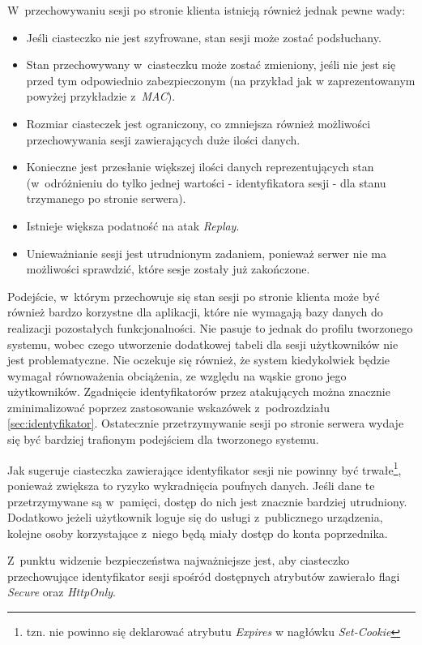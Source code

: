 \documentclass[11pt]{aghdpl}
\begin{document}
W~przechowywaniu sesji po stronie klienta istnieją również jednak pewne wady:
\begin{itemize}
\item Jeśli ciasteczko nie jest szyfrowane, stan sesji może zostać podsłuchany.
\item Stan przechowywany w~ciasteczku może zostać zmieniony, jeśli nie jest się przed tym odpowiednio zabezpieczonym (na przykład jak w zaprezentowanym powyżej przykładzie z~\emph{MAC}).
\item Rozmiar ciasteczek jest ograniczony, co zmniejsza również możliwości przechowywania sesji zawierających duże ilości danych.
\item Konieczne jest przesłanie większej ilości danych reprezentujących stan (w~odróżnieniu do tylko jednej wartości - identyfikatora sesji - dla stanu trzymanego po stronie serwera).
\item Istnieje większa podatność na atak \emph{Replay}.
\item Unieważnianie sesji jest utrudnionym zadaniem, ponieważ serwer nie ma możliwości sprawdzić, które sesje zostały już zakończone.
\end{itemize}

Podejście, w~którym przechowuje się stan sesji po stronie klienta może być również bardzo korzystne dla aplikacji, które nie wymagają bazy danych do realizacji pozostałych funkcjonalności. Nie pasuje to jednak do profilu tworzonego systemu, wobec czego utworzenie dodatkowej tabeli dla sesji użytkowników nie jest problematyczne. Nie oczekuje się również, że system kiedykolwiek będzie wymagał równoważenia obciążenia, ze względu na wąskie grono jego użytkowników. Zgadnięcie identyfikatorów przez atakujących można znacznie zminimalizować poprzez zastosowanie wskazówek z~podrozdziału \ref{sec:identyfikator}. Ostatecznie przetrzymywanie sesji po stronie serwera wydaje się być bardziej trafionym podejściem dla tworzonego systemu.

Jak sugeruje \cite{ClAu} ciasteczka zawierające identyfikator sesji nie powinny być trwałe\footnote{tzn. nie powinno się deklarować atrybutu \emph{Expires} w nagłówku \emph{Set-Cookie}}, ponieważ zwiększa to ryzyko wykradnięcia poufnych danych. Jeśli dane te przetrzymywane są w~pamięci, dostęp do nich jest znacznie bardziej utrudniony. Dodatkowo jeżeli użytkownik loguje się do usługi z~publicznego urządzenia, kolejne osoby korzystające z~niego będą miały dostęp do konta poprzednika.

Z~punktu widzenie bezpieczeństwa najważniejsze jest, aby ciasteczko przechowujące identyfikator sesji spośród dostępnych atrybutów zawierało flagi \emph{Secure} oraz \emph{HttpOnly}.
\end{document}
